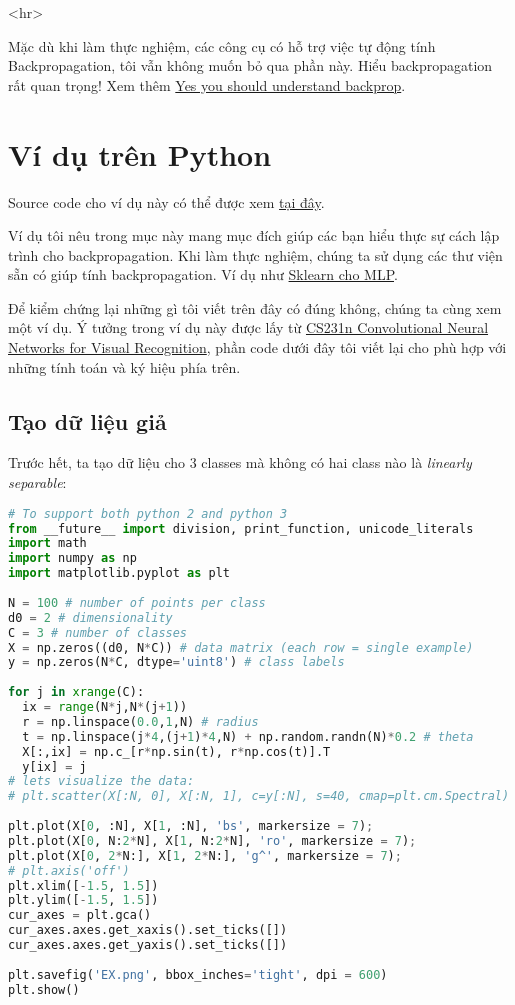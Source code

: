  <hr> 
 
 
 Mặc dù khi làm thực nghiệm, các công cụ có hỗ trợ việc tự động tính Backpropagation, tôi vẫn không muốn bỏ qua phần này. Hiểu backpropagation rất quan trọng! Xem thêm \href{https://medium.com/@karpathy/yes-you-should-understand-backprop-e2f06eab496b#.g76s9xxzc}{Yes you should understand backprop}. 
 
 
\section{Ví dụ trên Python}
Source code cho ví dụ này có thể được xem \href{https://github.com/tiepvupsu/tiepvupsu.github.io/blob/master/assets/14_mlp/Example%20.ipynb}{tại đây}. 
 
Ví dụ tôi nêu trong mục này mang mục đích giúp các bạn hiểu thực sự cách lập trình cho backpropagation. Khi làm thực nghiệm, chúng ta sử dụng các thư viện sẵn có giúp tính backpropagation. Ví dụ như \href{http://scikit-learn.org/stable/modules/neural_networks_supervised.html}{Sklearn cho MLP}. 
 
Để kiểm chứng lại những gì tôi viết trên đây có đúng không, chúng ta cùng xem một ví dụ. Ý tưởng trong ví dụ này được lấy từ \href{http://cs231n.github.io/neural-networks-case-study/}{CS231n Convolutional Neural Networks for Visual Recognition}, phần code dưới đây tôi viết lại cho phù hợp với những tính toán và ký hiệu phía trên. 
 
 
\subsection{Tạo dữ liệu giả}
 
Trước hết, ta tạo dữ liệu cho 3 classes mà không có hai class nào là \textit{linearly separable}: 
 
\begin{lstlisting}[language=Python]
# To support both python 2 and python 3 
from __future__ import division, print_function, unicode_literals 
import math 
import numpy as np 
import matplotlib.pyplot as plt 
 
N = 100 # number of points per class 
d0 = 2 # dimensionality 
C = 3 # number of classes 
X = np.zeros((d0, N*C)) # data matrix (each row = single example) 
y = np.zeros(N*C, dtype='uint8') # class labels 
 
for j in xrange(C): 
  ix = range(N*j,N*(j+1)) 
  r = np.linspace(0.0,1,N) # radius 
  t = np.linspace(j*4,(j+1)*4,N) + np.random.randn(N)*0.2 # theta 
  X[:,ix] = np.c_[r*np.sin(t), r*np.cos(t)].T 
  y[ix] = j 
# lets visualize the data: 
# plt.scatter(X[:N, 0], X[:N, 1], c=y[:N], s=40, cmap=plt.cm.Spectral) 
 
plt.plot(X[0, :N], X[1, :N], 'bs', markersize = 7); 
plt.plot(X[0, N:2*N], X[1, N:2*N], 'ro', markersize = 7); 
plt.plot(X[0, 2*N:], X[1, 2*N:], 'g^', markersize = 7); 
# plt.axis('off') 
plt.xlim([-1.5, 1.5]) 
plt.ylim([-1.5, 1.5]) 
cur_axes = plt.gca() 
cur_axes.axes.get_xaxis().set_ticks([]) 
cur_axes.axes.get_yaxis().set_ticks([]) 
 
plt.savefig('EX.png', bbox_inches='tight', dpi = 600) 
plt.show() 
\end{lstlisting}
 
